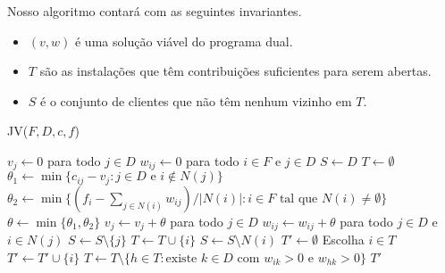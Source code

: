 Nosso algoritmo contará com as seguintes invariantes.
\begin{itemize}
    \item $(v,w)$ é uma solução viável do programa dual.
    \item $T$ são as instalações que têm contribuições suficientes para serem abertas.
    \item $S$ é o conjunto de clientes que não têm nenhum vizinho em $T$.
\end{itemize}
\begin{algorithm}[tbh]
    \caption{JV(${F,D,c,f}$)}
    \label{fl:primaldual}
    \begin{algorithmic}[1]
        \State $v_j \gets 0$ para todo $j \in D$
        \State $w_{ij} \gets 0$ para todo $i \in F$ e $j \in D$
        \State $S \gets D$
        \State $T \gets \emptyset$
        \State $\theta_1 \gets \min\{c_{ij}-v_j : j \in D \text{ e } i \not\in N(j)\}$ \label{theta1}
        \State $\theta_2 \gets \min\{(f_i - \sum_{j \in N(i)}w_{ij})/|N(i)| : i \in F \text{ tal que } N(i) \neq \emptyset \} \label{theta2}$
        \State $\theta \gets \min\{\theta_1,\theta_2\} \label{theta}$
        \State $v_j \gets v_j + \theta$ para todo $j \in D$
        \State $w_{ij} \gets w_{ij} + \theta$ para todo $j \in D$ e $i \in N(j)$ 
        \State $S \gets S \setminus \{j\}$
        \EndIf
        \State $T \gets T \cup \{i\}$
        \State $S \gets S\setminus N(i)$
        \EndIf
        \EndWhile
        \State $T' \gets \emptyset$
        \State Escolha $i \in T$
        \State $T' \gets T' \cup \{i\}$
        \State $T \gets T \setminus \{h \in T : \text{existe $k \in D$ com $w_{ik}> 0 $ e $w_{hk} > 0$} \}$
        \EndWhile
        \State \Return $T'$
    \end{algorithmic}
\end{algorithm}


